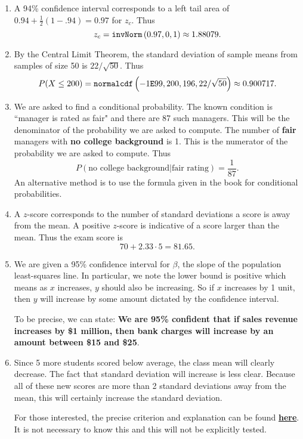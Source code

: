 \documentclass{article}
\newcommand{\calcfunc}[1]{\mbox{\texttt{#1}}}
\begin{document}
\begin{enumerate}
\item {} A 94\% confidence interval corresponds to a left tail area of $0.94 + \frac{1}{2}\left(1-.94\right)=0.97$ for $z_c$. Thus
$$z_c = \calcfunc{invNorm}\left(0.97,0,1\right)\approx 1.88079.$$

\item {} By the Central Limit Theorem, the standard deviation of sample means from samples of size 50 is $22/\sqrt{50}$. Thus $$P(X\leq 200) = \calcfunc{normalcdf}\left(-1\calcfunc{E}99, 200, 196, 22/\sqrt{50}\right) \approx 0.900717.$$

\item {} We are asked to find a conditional probability. The known condition is ``manager is rated as fair" and there are 87 such managers. This will be the denominator of the probability we are asked to compute. The number of \textbf{fair} managers with \textbf{no college background} is 1. This is the numerator of the probability we are asked to compute.  Thus
$$P\left(\mbox{no college background} | \mbox{fair rating} \right) = \frac{1}{87}.$$
An alternative method is to use the formula given in the book for conditional probabilities.

\item {} A $z$-score corresponds to the number of standard deviations a score is away from the mean. A positive $z$-score is indicative of a score larger than the mean. Thus the exam score is 
$$70 + 2.33\cdot 5 = 81.65.$$

\item {} We are given a 95\% confidence interval for $\beta$, the slope of the population least-squares line. In particular, we note the lower bound is positive which means as $x$ increases, $y$ should also be increasing. So if $x$ increases by 1 unit, then $y$ will increase by some amount dictated by the confidence interval.

To be precise, we can state: \textbf{We are 95\% confident that if sales revenue increases by \$1 million, then bank charges will increase by an amount between \$15 and \$25}.

\item {} Since 5 more students scored below average, the class mean will clearly decrease. The fact that standard deviation will increase is less clear. Because all of these new scores are more than 2 standard deviations away from the mean, this will certainly increase the standard deviation.

For those interested, the precise criterion and explanation can be found \href{http://stats.stackexchange.com/questions/73498/value-that-increases-the-standard-deviation}{\color{blue} \textbf{here}}. It is not necessary to know this and this will not be explicitly tested.


\end{enumerate}
\end{document}
